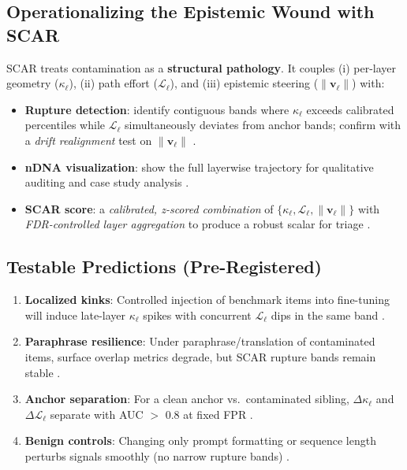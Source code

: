 \documentclass[11pt]{article}
\begin{document}
\subsection{Operationalizing the Epistemic Wound with \textsc{SCAR}}
\textsc{SCAR} treats contamination as a \textbf{structural pathology}. It couples (i) per-layer geometry ($\kappa_\ell$), (ii) path effort ($\mathcal{L}_\ell$), and (iii) epistemic steering ($\|\mathbf{v}_\ell\|$) with:
\begin{itemize}
    \item \textbf{Rupture detection}: identify contiguous bands where $\kappa_\ell$ exceeds calibrated percentiles while $\mathcal{L}_\ell$ simultaneously deviates from anchor bands; confirm with a \emph{drift realignment} test on $\|\mathbf{v}_\ell\|$ \citep{raghu2017svcca,kornblith2019cka}.
    \item \textbf{nDNA visualization}: show the full layerwise trajectory for qualitative auditing and case study analysis \citep{ansuini2019intrinsic}.
    \item \textbf{SCAR score}: a \emph{calibrated, z-scored combination} of $\{\kappa_\ell, \mathcal{L}_\ell, \|\mathbf{v}_\ell\|\}$ with \emph{FDR-controlled layer aggregation} to produce a robust scalar for triage \citep{deng2024investigating}.
\end{itemize}

\subsection{Testable Predictions (Pre-Registered)}
\begin{enumerate}[label=\textbf{P\arabic*}]
    \item \textbf{Localized kinks}: Controlled injection of benchmark items into fine-tuning will induce late-layer $\kappa_\ell$ spikes with concurrent $\mathcal{L}_\ell$ dips in the same band \citep{deng2024investigating}.
    \item \textbf{Paraphrase resilience}: Under paraphrase/translation of contaminated items, surface overlap metrics degrade, but SCAR rupture bands remain stable \citep{ribeiro2020checklist}.
    \item \textbf{Anchor separation}: For a clean anchor vs.\ contaminated sibling, $\Delta\kappa_\ell$ and $\Delta\mathcal{L}_\ell$ separate with AUC $>$ 0.8 at fixed FPR \citep{kornblith2019cka}.
    \item \textbf{Benign controls}: Changing only prompt formatting or sequence length perturbs signals smoothly (no narrow rupture bands) \citep{zhao2021calibrate,lu2022fantastically}.
\end{enumerate}
\end{document}
